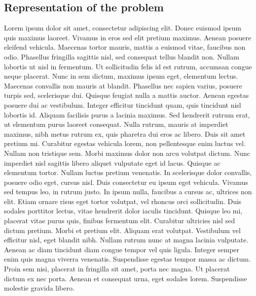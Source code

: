 \documentclass{article}
\begin{document}
\subsection{Representation of the problem}
Lorem ipsum dolor sit amet, consectetur adipiscing elit. Donec euismod ipsum quis maximus laoreet. Vivamus in eros sed elit pretium maximus. Aenean posuere eleifend vehicula. Maecenas tortor mauris, mattis a euismod vitae, faucibus non odio. Phasellus fringilla sagittis nisl, sed consequat tellus blandit non. Nullam lobortis ut nisl in fermentum. Ut sollicitudin felis id est rutrum, accumsan congue neque placerat. Nunc in sem dictum, maximus ipsum eget, elementum lectus. Maecenas convallis non mauris at blandit. Phasellus nec sapien varius, posuere turpis sed, scelerisque dui. Quisque feugiat nulla a mattis auctor. Aenean egestas posuere dui ac vestibulum. Integer efficitur tincidunt quam, quis tincidunt nisl lobortis id. Aliquam facilisis purus a lacinia maximus. Sed hendrerit rutrum erat, ut elementum purus laoreet consequat. Nulla rutrum, mauris at imperdiet maximus, nibh metus rutrum ex, quis pharetra dui eros ac libero.
\vspace{5mm}
\newline
Duis sit amet pretium mi. Curabitur egestas vehicula lorem, non pellentesque enim luctus vel. Nullam non tristique sem. Morbi maximus dolor non arcu volutpat dictum. Nunc imperdiet nisl sagittis libero aliquet vulputate eget id lacus. Quisque ac elementum tortor. Nullam luctus pretium venenatis. In scelerisque dolor convallis, posuere odio eget, cursus nisl. Duis consectetur eu ipsum eget vehicula. Vivamus sed tempus leo, in rutrum justo.
\vspace{5mm}
\newline
In ipsum nulla, faucibus a cursus ac, ultrices non elit. Etiam ornare risus eget tortor volutpat, vel rhoncus orci sollicitudin. Duis sodales porttitor lectus, vitae hendrerit dolor iaculis tincidunt. Quisque leo mi, placerat vitae purus quis, finibus fermentum elit. Curabitur ultricies nisl sed dictum pretium. Morbi et pretium elit. Aliquam erat volutpat. Vestibulum vel efficitur nisl, eget blandit nibh. Nullam rutrum nunc at magna lacinia vulputate. Aenean ac diam tincidunt diam congue tempor vel quis ligula. Integer semper enim quis magna viverra venenatis. Suspendisse egestas tempor massa ac dictum. Proin sem nisi, placerat in fringilla sit amet, porta nec magna. Ut placerat dictum ex nec porta. Aenean et consequat urna, eget sodales lorem. Suspendisse molestie gravida libero.
\vspace{5mm}
\end{document}
